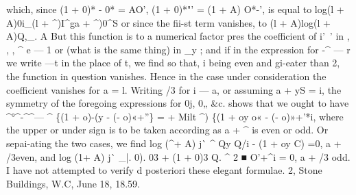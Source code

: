 \documentclass[11pt,a4paper]{book}
\begin{document}
which,  since  (1  +  0)*  -  0*  =  AO',  (1  + 0)*"' =  (1  +  A)  O*-',  is  equal  to
log(l  +  A)0i_(l  +  ^)I^ga  +  ^)0^S
or  since   the   fii-st   term   vanishes,    to
(l  +  A)log(l  +  A)Q,_.
A
But  this   function   is   to   a   numerical    factor  pres   the   coefficient   of  i'~'  in      ,     ,    ,
^  e  —  1
or  (what  is  the  same  thing)  in  _y ;   and  if  in  the  expression  for  -^ — r  we  write  —t  in
the  place  of  t,  we  find
so  that,  i  being  even  and  gi-eater  than  2,  the  function  in  question  vanishes.  Hence
in  the   case   under   consideration   the   coefficient   vanishes   for   a  =  l.
Writing  /3  for  i  —  a,  or  assuming  a  +  yS  =  i,  the  symmetry  of  the  foregoing  expressions
for  0j,  0„  \&c.  shows  that  we  ought  to  have
^°^-^^— ^  \{(1  +  o)-(y  -  (-  o)«+''\}  =  +  Milt  ^)  \{(1  +  oy  o«  -  (-  o)»+'*i,
where  the  upper  or  under  sign  is  to  be  taken  according  as  a  +  ^  is  even  or  odd.  Or
sepai-ating  the  two  cases,  we  find
log (^+  A)  j^^  ^ Qy  Q/i  - (1  +  oy  C)  =0,     a  +  /3even,
and
log  (1+  A)  j^^  _|.  0).  03  +  (1  +  0)3  Q.  ^  2  ■  O'+^i  =  0,     a  +  /3  odd.
I  have  not  attempted  to  verify  d  posteriori  these  elegant  formulae.
2,  Stone  Buildings,   W.C,  June  18,  18.59.


\newpage
\end{document}
